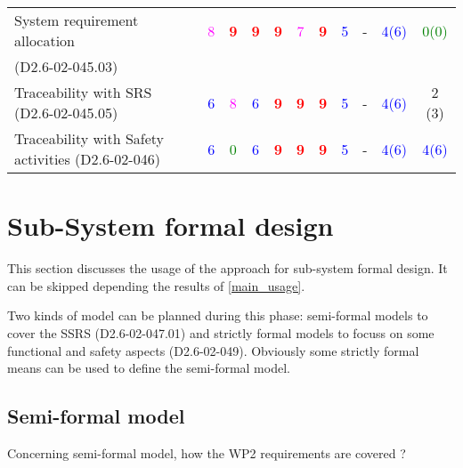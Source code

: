 \begin{tabular}{|l | c | c | c | c | c | c | c | c | c | c |}
\hline
System requirement allocation  & \textcolor{magenta}{8} & \textcolor{red}{\textbf{9}} & \textcolor{red}{\textbf{9}} & \textcolor{red}{\textbf{9}} & \textcolor{magenta}{7} & \textcolor{red}{\textbf{9}} & \textcolor{blue}{5} & - & \textcolor{blue}{4(6)}  & \textcolor{green}{0(0)}  \\
(D2.6-02-045.03)   &  &      &  &  & & &  &    &   &   \\
\hline
Traceability with SRS (D2.6-02-045.05) & \textcolor{blue}{6} & \textcolor{magenta}{8} & \textcolor{blue}{6} & \textcolor{red}{\textbf{9}} & \textcolor{red}{\textbf{9}} & \textcolor{red}{\textbf{9}} & \textcolor{blue}{5} & - & \textcolor{blue}{4(6)}  & 2 (3) \\
\hline
Traceability with Safety activities (D2.6-02-046) & \textcolor{blue}{6} & \textcolor{green}{0} & \textcolor{blue}{6} & \textcolor{red}{\textbf{9}} & \textcolor{red}{\textbf{9}} & \textcolor{red}{\textbf{9}} & \textcolor{blue}{5} & - & \textcolor{blue}{4(6)}  & \textcolor{blue}{4(6)}  \\
\hline
\end{tabular}



\section{Sub-System formal design}
This section discusses the usage of the approach for sub-system formal design.
It can be skipped depending the results of \ref{main_usage}.

Two kinds of model can be planned during this phase: semi-formal models to  cover the SSRS (D2.6-02-047.01) and strictly formal  models to  focuss on some functional and safety aspects (D2.6-02-049).  Obviously some strictly  formal means can be used to define the semi-formal  model.

\subsection{Semi-formal model}

Concerning semi-formal model, how the WP2 requirements are covered ?

